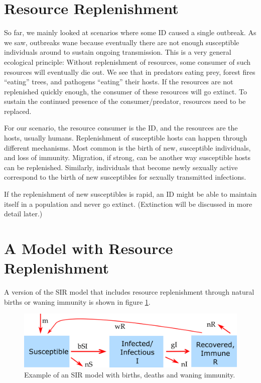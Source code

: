 \documentclass[]{book}
\theoremstyle{definition}
\theoremstyle{definition}
\theoremstyle{definition}
\theoremstyle{remark}
\begin{document}
\section{Resource Replenishment}\label{resource-replenishment}

So far, we mainly looked at scenarios where some ID caused a single
outbreak. As we saw, outbreaks wane because eventually there are not
enough susceptible individuals around to sustain ongoing transmission.
This is a very general ecological principle: Without replenishment of
resources, some consumer of such resources will eventually die out. We
see that in predators eating prey, forest fires ``eating'' trees, and
pathogens ``eating'' their hosts. If the resources are not replenished
quickly enough, the consumer of these resources will go extinct. To
sustain the continued presence of the consumer/predator, resources need
to be replaced.

For our scenario, the resource consumer is the ID, and the resources are
the hosts, usually humans. Replenishment of susceptible hosts can happen
through different mechanisms. Most common is the birth of new,
susceptible individuals, and loss of immunity. Migration, if strong, can
be another way susceptible hosts can be replenished. Similarly,
individuals that become newly sexually active correspond to the birth of
new susceptibles for sexually transmitted infections.

If the replenishment of new susceptibles is rapid, an ID might be able
to maintain itself in a population and never go extinct. (Extinction
will be discussed in more detail later.)

\section{A Model with Resource
Replenishment}\label{a-model-with-resource-replenishment}

A version of the SIR model that includes resource replenishment through
natural births or waning immunity is shown in figure
\ref{fig:birthdeathdmodel}.

\begin{figure}
\centering
\includegraphics{./images/R0modelfigure.png}
\caption{\label{fig:birthdeathdmodel}Example of an SIR model with births,
deaths and waning immunity.}
\end{figure}
\end{document}
